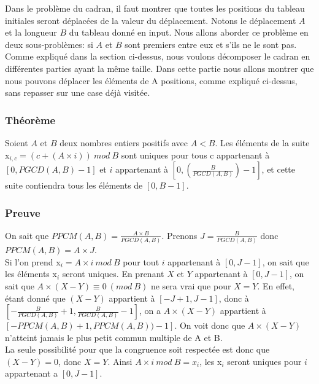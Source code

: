 Dans le problème du cadran, il faut montrer que toutes les positions du tableau initiales seront déplacées de la valeur du déplacement. Notons le déplacement $A$ et la longueur $B$ du tableau donné en input. Nous allons aborder ce problème en deux sous-problèmes: si $A$ et $B$ sont premiers entre eux et s'ils ne le sont pas.\\  

Comme expliqué dans la section ci-dessus, nous voulons décomposer le cadran en différentes parties ayant la même taille. Dans cette partie nous allons montrer que nous pouvons déplacer les éléments de A positions, comme expliqué ci-dessus, sans repasser sur une case déjà visitée. \\

\subsubsection*{Théorème}
Soient $A$ et $B$ deux nombres entiers positifs avec $A < B$. Les éléments de la suite x$_{i,c} = (c + (A\times i))\ mod\ B$ sont uniques pour tous c appartenant à $[0, PGCD(A,B)-1]$ et $i$ appartenant à $[0, (\frac{B}{PGCD(A,B)})-1]$, et cette suite contiendra tous les éléments de $[0, B-1]$. \\

\subsubsection*{Preuve}

On sait que $PPCM(A,B) = \frac{A\times B}{PGCD(A,B)}$. Prenons $J = \frac{B}{PGCD(A,B)}$ donc $PPCM(A,B) = A\times J$.\\

Si l'on prend x$_{i} = A\times i\ mod\ B$ pour tout $i$ appartenant à $[0, J-1]$, on sait que les éléments x$_{i}$ seront uniques. En prenant $X$ et $Y$ appartenant à $[0, J-1]$, on sait que $A\times (X-Y) ≡ 0\ (mod\ B)$ ne sera vrai que pour $X=Y$. En effet, étant donné que $(X-Y)$ appartient à $[-J+1, J-1]$, donc à $[- \frac{B}{PGCD(A,B)} +1,\frac{B}{PGCD(A,B)} -1] $, on a $A\times (X-Y)$ appartient à $[- PPCM(A,B) +1, PPCM(A,B) )-1]$. On voit donc que $A\times (X-Y)$ n'atteint jamais le plus petit commun multiple de A et B.\\
La seule possibilité pour que la congruence soit respectée est donc que $(X-Y) = 0$, donc $X=Y$. Ainsi $A\times i\ mod\ B = x_{i}$, les x$_{i}$ seront uniques pour $i$ appartenant a $[0, J-1]$.\\

